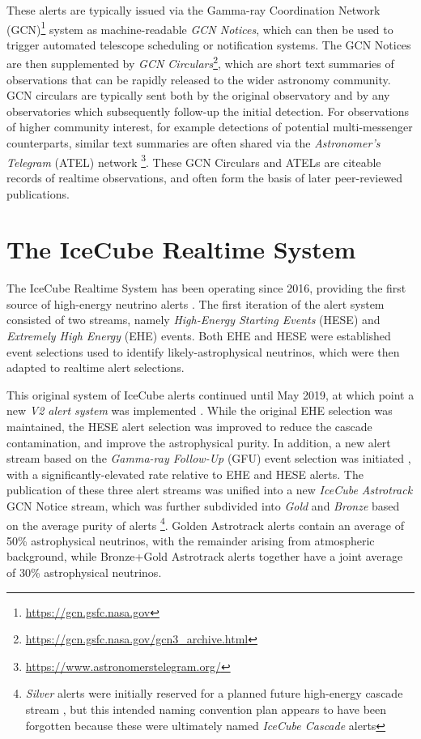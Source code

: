 These alerts are typically issued via the Gamma-ray Coordination Network (GCN)\footnote{ \url{https://gcn.gsfc.nasa.gov} } system as machine-readable \emph{GCN Notices}, which can then be used to trigger automated telescope scheduling or notification systems. The GCN Notices are then supplemented by \emph{GCN Circulars}\footnote{ \url{https://gcn.gsfc.nasa.gov/gcn3_archive.html}}, which are short text summaries of observations that can be rapidly released to the wider astronomy community. GCN circulars are typically sent both by the original observatory and by any observatories which subsequently follow-up the initial detection. For observations of higher community interest, for example detections of potential multi-messenger counterparts, similar text summaries are often shared via the \emph{Astronomer's Telegram} (ATEL) network \footnote{\url{https://www.astronomerstelegram.org/}}. These GCN Circulars and ATELs are citeable records of realtime observations, and often form the basis of later peer-reviewed publications.

\section{The IceCube Realtime System}
The IceCube Realtime System has been operating since 2016, providing the first source of high-energy neutrino alerts . The first iteration of the alert system consisted of two streams, namely \emph{High-Energy Starting Events} (HESE) and \emph{Extremely High Energy} (EHE) events. Both EHE  and HESE  were established event selections used to identify likely-astrophysical neutrinos, which were then adapted to realtime alert selections. 

This original system of IceCube alerts continued until May 2019, at which point a new \emph{V2 alert system} was implemented . While the original EHE selection was maintained, the HESE alert selection was improved to reduce the cascade contamination, and improve the astrophysical purity. In addition, a new alert stream based on the \emph{Gamma-ray Follow-Up} (GFU) event selection was initiated , with a significantly-elevated rate relative to EHE and HESE alerts. The publication of these three alert streams was unified into a new \emph{IceCube Astrotrack} GCN Notice stream, which was further subdivided into \emph{Gold} and \emph{Bronze} based on the average purity of alerts \footnote{\emph{Silver} alerts were initially reserved for a planned future high-energy cascade stream \cite{kintscher_thesis}, but this intended naming convention plan appears to have been forgotten because these were ultimately named \emph{IceCube Cascade} alerts}. Golden Astrotrack alerts contain an average of 50\% astrophysical neutrinos, with the remainder arising from atmospheric background, while Bronze+Gold Astrotrack alerts together have a joint average of 30\% astrophysical neutrinos. 


